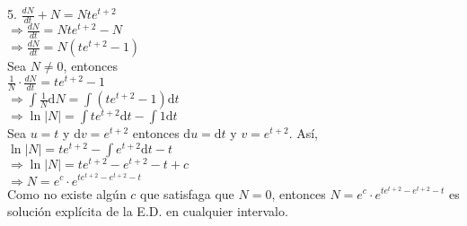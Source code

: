 \documentclass{article}
\begin{document}
      5. $ \displaystyle \frac{dN}{dt}+N=Nte^{t+2} $ \\
      
      $ \displaystyle \Longrightarrow \frac{dN}{dt}=Nte^{t+2}-N $ \\

      $ \displaystyle \Longrightarrow \frac{dN}{dt}=N(te^{t+2}-1) $ \\

      Sea $ N \neq 0 $, entonces \\

      $ \displaystyle \frac{1}{N}  \cdot \frac{dN}{dt}=te^{t+2}-1 $ \\

      $ \displaystyle \Longrightarrow \int \frac{1}{N} \mathrm{d}N = \int (te^{t+2}-1) \mathrm{d}t $ \\

      $ \displaystyle \Longrightarrow \ln |N| = \int te^{t+2} \mathrm{d}t - \int 1 \mathrm{d}t $ \\
      
      Sea $ u=t $ y $ \mathrm{d}v = e^{t+2} $ entonces $ \mathrm{d}u = \mathrm{d}t $ y $ v = e^{t+2} $. Así, \\

      $ \displaystyle \ln |N| = te^{t+2} - \int e^{t+2}\mathrm{d}t - t $ \\

      $ \Longrightarrow \ln |N| = te^{t+2} - e^{t+2} - t + c $ \\

      $ \Longrightarrow N = e^c \cdot e^{te^{t+2} - e^{t+2} - t} $ \\

      Como no existe algún $ c $ que satisfaga que $ N = 0 $, entonces $ N = e^c \cdot e^{te^{t+2} - e^{t+2} - t} $ es solución explícita de la E.D. en cualquier intervalo.
\end{document}

